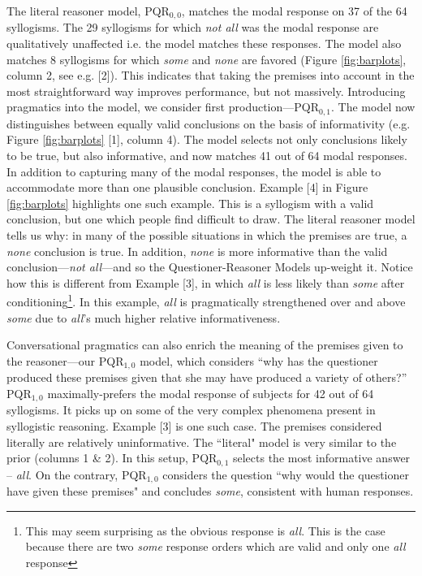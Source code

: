 \documentclass[10pt,letterpaper]{article}
\begin{document}
The literal reasoner model, PQR$_{0,0}$, matches the modal response on 37 of the 64 syllogisms. The 29 syllogisms for which \emph{not all} was the modal response are qualitatively unaffected i.e. the model matches these responses. The model also matches 8 syllogisms for which \emph{some} and \emph{none} are favored (Figure \ref{fig:barplots}, column 2, see e.g. [2]). This indicates that taking the premises into account in the most straightforward way improves performance, but not massively.
%
Introducing pragmatics into the model, we consider first production---PQR$_{0,1}$. The model now distinguishes between equally valid conclusions on the basis of informativity (e.g. Figure \ref{fig:barplots} [1], column 4). The model selects not only conclusions likely to be true, but also informative, and now matches 41 out of 64 modal responses. 
%
In addition to capturing many of the modal responses, the model is able to accommodate more than one plausible conclusion. Example [4] in Figure \ref{fig:barplots} highlights one such example. This is a syllogism with a valid conclusion, but one which people find difficult to draw. The literal reasoner model tells us why: in many of the possible situations in which the premises are true, a \emph{none} conclusion is true. In addition, \emph{none} is more informative than the valid conclusion---\emph{not all}---and so the Questioner-Reasoner Models up-weight it. Notice how this is different from Example [3], in which \emph{all} is less likely than \emph{some} after conditioning\footnote{This may seem surprising as the obvious response is \emph{all}. This is the case because there are two \emph{some} response orders which are valid and only one \emph{all} response}. In this example, \emph{all} is pragmatically strengthened over and above \emph{some} due to \emph{all}'s much higher relative informativeness.  


Conversational pragmatics can also enrich the meaning of the premises given to the reasoner---our PQR$_{1,0}$ model, which considers ``why has the questioner produced these premises given that she may have produced a variety of others?'' 
PQR$_{1,0}$ maximally-prefers the modal response of subjects for 42 out of 64 syllogisms. It picks up on some of the very complex phenomena present in syllogistic reasoning. Example [3] is one such case. The premises considered literally are relatively uninformative. The ``literal" model is very similar to the prior (columns 1 \& 2). In this setup, PQR$_{0,1}$ selects the most informative answer -- \emph{all}. On the contrary, PQR$_{1,0}$ considers the question ``why would the questioner have given these premises" and concludes \emph{some}, consistent with human responses. 
\end{document}
